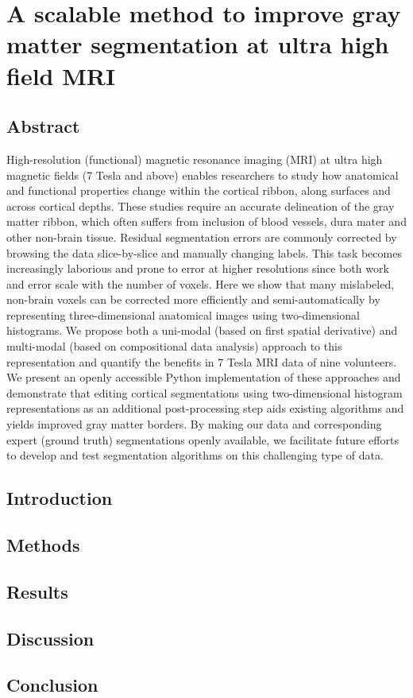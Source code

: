 \chapter{A scalable method to improve gray matter segmentation at ultra high field MRI}

\clearpage
\section{Abstract}
High-resolution (functional) magnetic resonance imaging (MRI) at ultra high magnetic fields (7 Tesla and above) enables researchers to study how anatomical and functional properties change within the cortical ribbon, along surfaces and across cortical depths. These studies require an accurate delineation of the gray matter ribbon, which often suffers from inclusion of blood vessels, dura mater and other non-brain tissue. Residual segmentation errors are commonly corrected by browsing the data slice-by-slice and manually changing labels. This task becomes increasingly laborious and prone to error at higher resolutions since both work and error scale with the number of voxels. Here we show that many mislabeled, non-brain voxels can be corrected more efficiently and semi-automatically by representing three-dimensional anatomical images using two-dimensional histograms. We propose both a uni-modal (based on first spatial derivative) and multi-modal (based on compositional data analysis) approach to this representation and quantify the benefits in 7 Tesla MRI data of nine volunteers. We present an openly accessible Python implementation of these approaches and demonstrate that editing cortical segmentations using two-dimensional histogram representations as an additional post-processing step aids existing algorithms and yields improved gray matter borders. By making our data and corresponding expert (ground truth) segmentations openly available, we facilitate future efforts to develop and test segmentation algorithms on this challenging type of data.


\section{Introduction}
\lipsum[1-1] 

\section{Methods}
\lipsum[1-2]
\cite{Lakatos1970}

\section{Results}
\lipsum[1-3]

\section{Discussion}
\lipsum[1-4]

\section{Conclusion}
\lipsum[1-5]

\clearpage
\printbibliography[heading=subbibnumbered, title={References}]